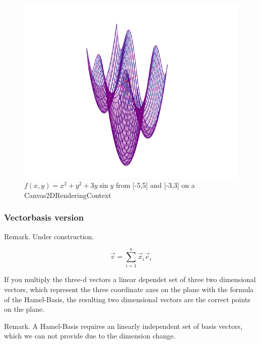 \documentclass[a4paper]{article}
\begin{document}
\begin{Theorem}
\begin{figure}[ht]
\includegraphics[scale=0.5]{fxyplot.png}
\caption{$f(x,y) = x^2 + y^2 + 3y \sin y$ from [-5,5] and [-3,3] on a Canvas2DRenderingContext}
\end{figure}
\end{Theorem}


\subsubsection{Vectorbasis version }

Remark. Under construction.

\begin{displaymath}
\vec{v} = \sum_{i=1}^{n}\vec{x}_{i}\vec{e}_{i}
\end{displaymath}

If you multiply the three-d vectors a linear dependet set of three two dimensional vectors, which represent the three coordinate axes on the plane with the formula of the Hamel-Basis, the resulting two dimensional vectors are the correct points on the plane.

Remark. A Hamel-Basis requires an linearly independent set of basis vectors, which we can not provide due to the dimension change.
\end{document}
